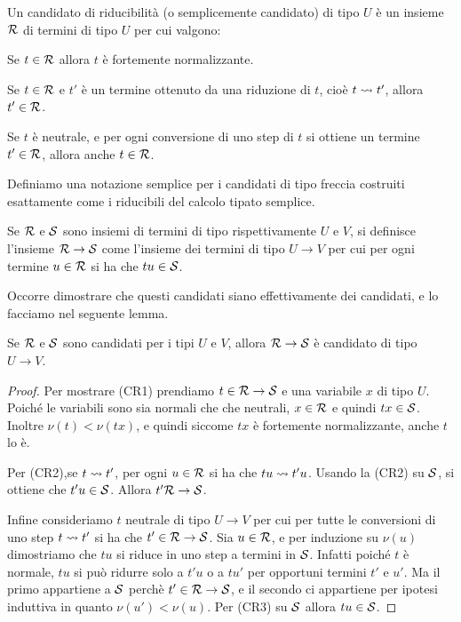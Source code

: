 \documentclass[]{marticle}
\begin{document}
\begin{block}[Definizione]
    Un candidato di riducibilit\`a (o semplicemente candidato) di tipo $U$ \`e
    un insieme $\mathcal{R}$ di termini di tipo $U$ per cui valgono:
    \begin{nlist}[CR1]
        \item Se $t\in\mathcal{R}$ allora $t$ \`e fortemente normalizzante.
        \item Se $t\in\mathcal{R}$ e $t'$ \`e un termine ottenuto da una riduzione
            di $t$, cio\`e $t\rightsquigarrow t'$, allora $t'\in\mathcal{R}$.
        \item  Se $t$ \`e neutrale, e per ogni conversione di uno step di $t$ si
            ottiene un termine $t'\in\mathcal{R}$, allora anche $t\in\mathcal{R}$.
    \end{nlist}
\end{block}

Definiamo una notazione semplice per i candidati di tipo freccia costruiti
esattamente come i riducibili del calcolo tipato semplice.
\begin{block}[Definizione]
    Se $\mathcal{R}$ e $\mathcal{S}$ sono insiemi di termini di tipo rispettivamente $U$
    e $V$, si definisce l'insieme $\mathcal{R}\rightarrow\mathcal{S}$ come l'insieme dei
    termini di tipo $U\rightarrow V$ per cui per ogni termine $u\in\mathcal{R}$ si
    ha che $tu\in\mathcal{S}$.
\end{block}

Occorre dimostrare che questi candidati siano effettivamente dei candidati, e lo
facciamo nel seguente lemma.
\begin{block} [Lemma]
    Se $\mathcal{R}$ e $\mathcal{S}$ sono candidati per i tipi $U$ e $V$, allora
    $\mathcal{R}\rightarrow\mathcal{S}$ \`e candidato di tipo $U\rightarrow V$.
\end{block}
\begin{proof}
    Per mostrare (CR1) prendiamo $t\in\mathcal{R}\rightarrow\mathcal{S}$ e una variabile
    $x$ di tipo $U$. Poich\'e le variabili sono sia normali che che neutrali,
    $x\in \mathcal{R}$ e quindi $tx\in\mathcal{S}$. Inoltre $\nu(t)<\nu(tx)$, e quindi
    siccome $tx$ \`e fortemente normalizzante, anche $t$ lo \`e.

    Per (CR2),se $t\rightsquigarrow t'$, per ogni $u \in \mathcal{R}$ si ha che $tu\rightsquigarrow
    t'u$. Usando la (CR2) su $\mathcal{S}$, si ottiene che $t'u\in\mathcal{S}$. Allora
    $t'\mathcal{R}\rightarrow\mathcal{S}$.

    Infine consideriamo $t$ neutrale di tipo $U\rightarrow V$ per cui per tutte
    le conversioni di uno step $t\rightsquigarrow t'$ si ha che $t' \in
    \mathcal{R}\rightarrow\mathcal{S}$. Sia $u\in\mathcal{R}$, e per induzione su $\nu(u)$
    dimostriamo che $tu$ si riduce in uno step a termini in $\mathcal{S}$. Infatti
    poich\'e $t$ \`e normale, $tu$ si pu\`o ridurre solo a $t'u$ o a $tu'$ per
    opportuni termini $t'$ e $u'$. Ma il primo appartiene a $\mathcal{S}$ perch\`e
    $t'\in\mathcal{R}\rightarrow\mathcal{S}$, e il secondo ci appartiene per ipotesi
    induttiva in quanto $\nu(u')<\nu(u)$. Per (CR3) su $\mathcal{S}$ allora
    $tu\in\mathcal{S}$. 
\end{proof}
\end{document}
